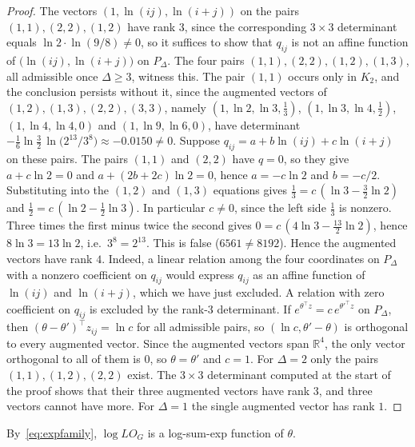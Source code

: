 \documentclass[a5paper, 10pt]{article}
\theoremstyle{plain}
\theoremstyle{remark}
\theoremstyle{definition}
\begin{document}
  \begin{proof}
  The vectors $(1, \ln(ij), \ln(i+j))$ on the pairs $(1,1), (2,2),
  (1,2)$ have rank $3$, since the corresponding $3 \times 3$ determinant
  equals $\ln 2 \cdot \ln(9/8) \ne 0$, so it suffices to show that
  $q_{ij}$ is not an affine function of $\bigl(\ln(ij), \ln(i+j)\bigr)$
  on $P_{\Delta}$. The four pairs $(1,1), (2,2), (1,2), (1,3)$, all admissible once $\Delta \ge 3$, witness this. The pair $(1,1)$ occurs only in $K_2$, and the conclusion persists without it, since the augmented vectors of $(1,2), (1,3), (2,2), (3,3)$, namely $(1, \ln 2, \ln 3, \tfrac13)$, $(1, \ln 3, \ln 4, \tfrac12)$, $(1, \ln 4, \ln 4, 0)$ and $(1, \ln 9, \ln 6, 0)$, have determinant $-\tfrac16 \ln\tfrac32 \,\ln\bigl(2^{13}/3^{8}\bigr) \approx -0.0150 \ne 0$. Suppose
  $q_{ij} = a + b \ln(ij) + c \ln(i+j)$ on these pairs. The pairs
  $(1,1)$ and $(2,2)$ have $q = 0$, so they give $a + c \ln 2 = 0$ and
  $a + (2b + 2c) \ln 2 = 0$, hence $a = -c \ln 2$ and $b = -c/2$.
  Substituting into the $(1,2)$ and $(1,3)$ equations gives
  $\tfrac13 = c\,(\ln 3 - \tfrac32 \ln 2)$ and
  $\tfrac12 = c\,(\ln 2 - \tfrac12 \ln 3)$. In particular $c \neq 0$,
  since the left side $\tfrac13$ is nonzero.
  Three times the first minus twice the second gives
  $0 = c\,(4 \ln 3 - \tfrac{13}{2} \ln 2)$, hence $8 \ln 3 = 13 \ln 2$,
  i.e.\ $3^{8} = 2^{13}$. This is false ($6561 \neq 8192$). Hence the
  augmented vectors have rank $4$. Indeed, a linear relation among the
  four coordinates on $P_{\Delta}$ with a nonzero coefficient on
  $q_{ij}$ would express $q_{ij}$ as an affine function of $\ln(ij)$
  and $\ln(i+j)$, which we have just excluded. A relation with zero
  coefficient on $q_{ij}$ is excluded by the rank-$3$ determinant. If
  $e^{\theta^{\top} z} = c\, e^{\theta'^{\top} z}$ on $P_{\Delta}$,
  then $(\theta - \theta')^{\top} z_{ij} = \ln c$ for all admissible
  pairs, so $(\ln c, \theta' - \theta)$ is orthogonal to every
  augmented vector. Since the augmented vectors span $\mathbb{R}^4$,
  the only vector orthogonal to all of them is $0$, so
  $\theta = \theta'$ and $c = 1$. For
  $\Delta = 2$ only the pairs $(1,1), (1,2), (2,2)$ exist. The
  $3 \times 3$ determinant computed at the start of the proof shows
  that their three augmented vectors have rank $3$, and three vectors
  cannot have more. For
  $\Delta = 1$ the single augmented vector has rank $1$.
  \end{proof}

  By~\eqref{eq:expfamily}, $\log LO_G$ is a log-sum-exp function of
  $\theta$.
\end{document}
